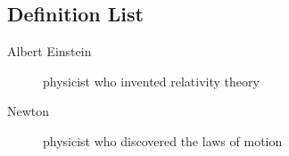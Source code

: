\subsection{Definition List}
\begin{description}
  \item[Albert Einstein] physicist who invented relativity theory
  \item[Newton] physicist who discovered the laws of motion
\end{description}




